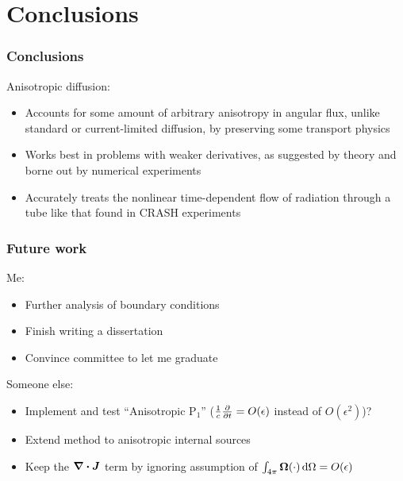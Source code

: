 \documentclass{beamer}
\begin{document}
\section{Conclusions}
\begin{frame}
  \frametitle{Conclusions}
  Anisotropic diffusion:
  \begin{itemize}
    \item Accounts for some amount of arbitrary anisotropy in
      angular flux, unlike standard or current-limited diffusion, by
      preserving some transport physics
    \item Works best in problems with weaker derivatives, as suggested by
      theory and borne out by numerical experiments
    \item Accurately treats the nonlinear time-dependent flow of radiation
      through a tube like that found in CRASH experiments
  \end{itemize}
\end{frame}
\begin{frame}
  \frametitle{Future work}
  Me:
  \begin{itemize}
    \item Further analysis of boundary conditions
    \item Finish writing a dissertation
    \item Convince committee to let me graduate
  \end{itemize}
  Someone else:
  \begin{itemize}
    \item Implement and test ``Anisotropic P$_1$''
      ($\frac1c\frac{\partial }{\partial t}=O(\epsilon)$ instead of $O(\epsilon^2)$)?
    \item Extend method to anisotropic internal sources
    \item Keep the $\bm{\nabla} \bm{\cdot} \bm{J}$ term by ignoring assumption of
      $\int_{4\pi} \bm{\Omega} (\cdot) \mathop{}\!\mathrm{d}\Omega = O(\epsilon)$ 
  \end{itemize}
\end{frame}
\appendix
\end{document}
